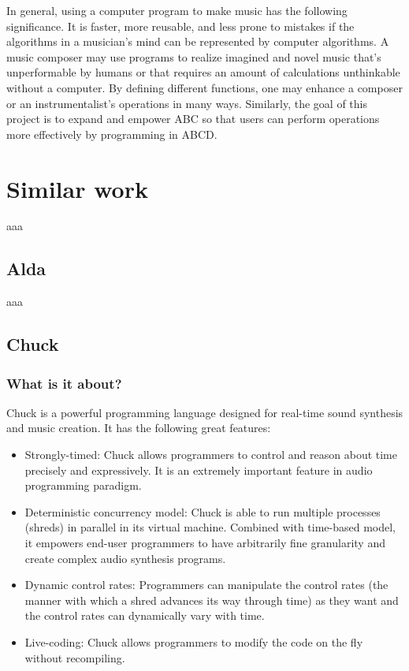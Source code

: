 In general, using a computer program to make music has the following significance. It is faster, more reusable, and less prone to mistakes if the algorithms in a musician's mind can be represented by computer algorithms. A music composer may use programs to realize imagined and novel music that's unperformable by humans or that requires an amount of calculations unthinkable without a computer. By defining different functions, one may enhance a composer or an instrumentalist's operations in many ways. Similarly, the goal of this project is to expand and empower ABC so that users can perform operations more effectively by programming in ABCD. 


\section{Similar work}

aaa

\subsection{Alda}

aaa

\subsection{Chuck}

	\subsubsection{What is it about?}

	Chuck is a powerful programming language designed for real-time sound synthesis and music creation\cite{WangCook02}.  It has the following great features\cite{Wang08}:
	\begin{itemize}
	\item Strongly-timed: Chuck allows programmers to control and reason about time precisely and expressively. It is an extremely important feature in audio programming paradigm.
	\item Deterministic concurrency model: Chuck is able to run multiple processes (shreds) in parallel in its virtual machine. Combined with time-based model, it empowers end-user programmers to have arbitrarily fine granularity and create complex audio synthesis programs. 
	\item Dynamic control rates: Programmers can manipulate the control rates (the manner with which a shred advances its way through time\cite{Wang08}) as they want and the control rates can dynamically vary with time.
	\item Live-coding:  Chuck allows programmers to modify the code on the fly without recompiling.
	\end{itemize}

